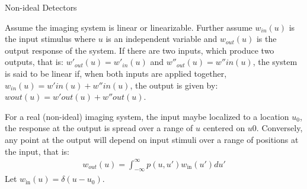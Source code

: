 \documentclass[mphy386-notes.tex]{subfiles}
\begin{document}
Non-ideal Detectors

Assume the imaging system is linear or linearizable. Further assume $w_{in}(u)$
is the input stimulus where $u$ is an independent variable and $w_{out}(u)$ is
the output response of the system. If there are two inputs, which produce two
outputs, that is: $w'_{out}(u) = w'_{in}(u)$ and $w''_{out}(u) = w''in(u)$, the
system is said to be linear if, when both inputs are applied together, $w_{in}(u) =
w'in(u) + w''in(u)$, the output is given by: $wout(u) = w'out(u) + w''out(u)$.

For a real (non-ideal) imaging system, the input maybe localized to a location
$u_0$, the response at the output is spread over a range of $u$ centered on
$u0$. Conversely, any point at the output will depend on input stimuli over a
range of positions at the input, that is:
\begin{align*}
  w_{out}(u) = \int_{-\infty}^{\infty} p(u, u') w_{\text{in}}(u')du'
\end{align*}
Let $w_{\text{in}}(u) = \delta(u - u_0)$. 
\end{document}
